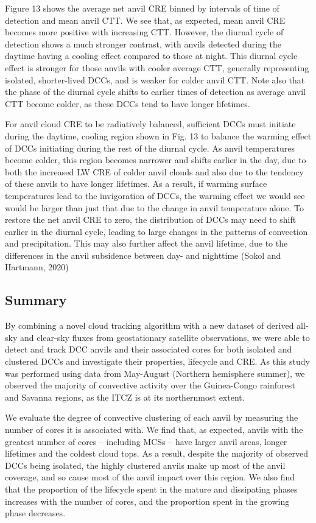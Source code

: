 Figure 13 shows the average net anvil CRE binned by intervals of time of
detection and mean anvil CTT. We see that, as expected, mean anvil CRE
becomes more positive with increasing CTT. However, the diurnal cycle of
detection shows a much stronger contrast, with anvils detected during
the daytime having a cooling effect compared to those at night. This
diurnal cycle effect is stronger for those anvils with cooler average
CTT, generally representing isolated, shorter-lived DCCs, and is weaker
for colder anvil CTT. Note also that the phase of the diurnal cycle
shifts to earlier times of detection as average anvil CTT become colder,
as these DCCs tend to have longer lifetimes.

For anvil cloud CRE to be radiatively balanced, sufficient DCCs must
initiate during the daytime, cooling region shown in Fig. 13 to balance
the warming effect of DCCs initiating during the rest of the diurnal
cycle. As anvil temperatures become colder, this region becomes narrower
and shifts earlier in the day, due to both the increased LW CRE of
colder anvil clouds and also due to the tendency of these anvils to have
longer lifetimes. As a result, if warming surface temperatures lead to
the invigoration of DCCs, the warming effect we would see would be
larger than just that due to the change in anvil temperature alone. To
restore the net anvil CRE to zero, the distribution of DCCs may need to
shift earlier in the diurnal cycle, leading to large changes in the
patterns of convection and precipitation. This may also further affect
the anvil lifetime, due to the differences in the anvil subsidence
between day- and nighttime (Sokol and Hartmann, 2020)

\subsection{Summary}

By combining a novel cloud tracking algorithm with a new dataset of
derived all-sky and clear-sky fluxes from geostationary satellite
observations, we were able to detect and track DCC anvils and their
associated cores for both isolated and clustered DCCs and investigate
their properties, lifecycle and CRE. As this study was performed using
data from May-August (Northern hemisphere summer), we observed the
majority of convective activity over the Guinea-Congo rainforest and
Savanna regions, as the ITCZ is at its northernmost extent.

We evaluate the degree of convective clustering of each anvil by
measuring the number of cores it is associated with. We find that, as
expected, anvils with the greatest number of cores -- including MCSs --
have larger anvil areas, longer lifetimes and the coldest cloud tops. As
a result, despite the majority of observed DCCs being isolated, the
highly clustered anvils make up most of the anvil coverage, and so cause
most of the anvil impact over this region. We also find that the
proportion of the lifecycle spent in the mature and dissipating phases
increases with the number of cores, and the proportion spent in the
growing phase decreases.

